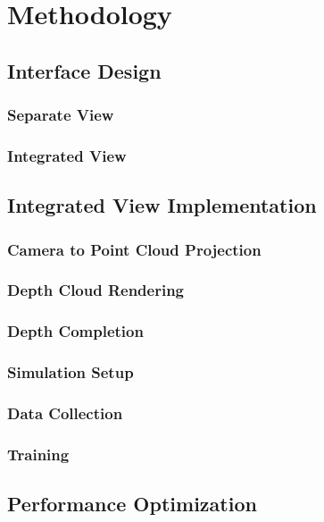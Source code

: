 
\chapter{Methodology}\label{chapter:methodology}

\section{Interface Design}
\subsection{Separate View}
\subsection{Integrated View}

\section{Integrated View Implementation}\label{section:integratedviewimplementation}
\subsection{Camera to Point Cloud Projection}
\subsection{Depth Cloud Rendering}
\subsection{Depth Completion}
\subsection{Simulation Setup}
\subsection{Data Collection}

\subsection{Training}

\section{Performance Optimization}
